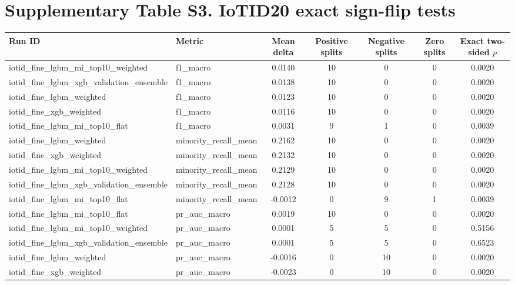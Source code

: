 \documentclass[10pt]{article}
\begin{document}
\section*{Supplementary Table S3. IoTID20 exact sign-flip tests}

\begin{center}
\tiny
\begin{longtable}{llccccc}
\toprule
Run ID & Metric & Mean delta & Positive splits & Negative splits & Zero splits & Exact two-sided $p$ \\
\midrule
\endhead
iotid\_fine\_lgbm\_mi\_top10\_weighted & f1\_macro & 0.0140 & 10 & 0 & 0 & 0.0020 \\
iotid\_fine\_lgbm\_xgb\_validation\_ensemble & f1\_macro & 0.0138 & 10 & 0 & 0 & 0.0020 \\
iotid\_fine\_lgbm\_weighted & f1\_macro & 0.0123 & 10 & 0 & 0 & 0.0020 \\
iotid\_fine\_xgb\_weighted & f1\_macro & 0.0116 & 10 & 0 & 0 & 0.0020 \\
iotid\_fine\_lgbm\_mi\_top10\_flat & f1\_macro & 0.0031 & 9 & 1 & 0 & 0.0039 \\
iotid\_fine\_lgbm\_weighted & minority\_recall\_mean & 0.2162 & 10 & 0 & 0 & 0.0020 \\
iotid\_fine\_xgb\_weighted & minority\_recall\_mean & 0.2132 & 10 & 0 & 0 & 0.0020 \\
iotid\_fine\_lgbm\_mi\_top10\_weighted & minority\_recall\_mean & 0.2129 & 10 & 0 & 0 & 0.0020 \\
iotid\_fine\_lgbm\_xgb\_validation\_ensemble & minority\_recall\_mean & 0.2128 & 10 & 0 & 0 & 0.0020 \\
iotid\_fine\_lgbm\_mi\_top10\_flat & minority\_recall\_mean & -0.0012 & 0 & 9 & 1 & 0.0039 \\
iotid\_fine\_lgbm\_mi\_top10\_flat & pr\_auc\_macro & 0.0019 & 10 & 0 & 0 & 0.0020 \\
iotid\_fine\_lgbm\_mi\_top10\_weighted & pr\_auc\_macro & 0.0001 & 5 & 5 & 0 & 0.5156 \\
iotid\_fine\_lgbm\_xgb\_validation\_ensemble & pr\_auc\_macro & 0.0001 & 5 & 5 & 0 & 0.6523 \\
iotid\_fine\_lgbm\_weighted & pr\_auc\_macro & -0.0016 & 0 & 10 & 0 & 0.0020 \\
iotid\_fine\_xgb\_weighted & pr\_auc\_macro & -0.0023 & 0 & 10 & 0 & 0.0020 \\
\bottomrule
\end{longtable}
\end{center}
\end{document}
